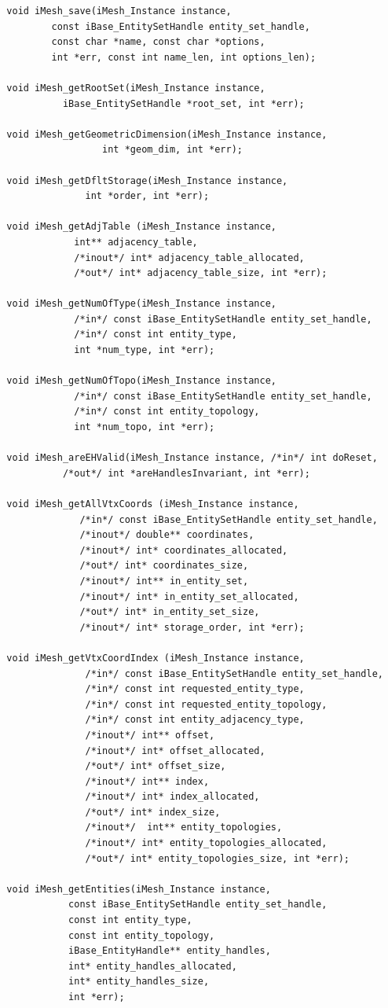 \documentclass{article}
\begin{document}
\begin{small}
\begin{verbatim}
  void iMesh_save(iMesh_Instance instance,
		  const iBase_EntitySetHandle entity_set_handle,
		  const char *name, const char *options,
		  int *err, const int name_len, int options_len);

  void iMesh_getRootSet(iMesh_Instance instance,
			iBase_EntitySetHandle *root_set, int *err);

  void iMesh_getGeometricDimension(iMesh_Instance instance,
				   int *geom_dim, int *err);

  void iMesh_getDfltStorage(iMesh_Instance instance,
			    int *order, int *err);

  void iMesh_getAdjTable (iMesh_Instance instance,
			  int** adjacency_table,
			  /*inout*/ int* adjacency_table_allocated,
			  /*out*/ int* adjacency_table_size, int *err);

  void iMesh_getNumOfType(iMesh_Instance instance,
			  /*in*/ const iBase_EntitySetHandle entity_set_handle,
			  /*in*/ const int entity_type,
			  int *num_type, int *err);

  void iMesh_getNumOfTopo(iMesh_Instance instance,
			  /*in*/ const iBase_EntitySetHandle entity_set_handle,
			  /*in*/ const int entity_topology,
			  int *num_topo, int *err);

  void iMesh_areEHValid(iMesh_Instance instance, /*in*/ int doReset,
			/*out*/ int *areHandlesInvariant, int *err);

  void iMesh_getAllVtxCoords (iMesh_Instance instance,
			   /*in*/ const iBase_EntitySetHandle entity_set_handle,
			   /*inout*/ double** coordinates,
			   /*inout*/ int* coordinates_allocated,
			   /*out*/ int* coordinates_size,
			   /*inout*/ int** in_entity_set,
			   /*inout*/ int* in_entity_set_allocated,
			   /*out*/ int* in_entity_set_size,
			   /*inout*/ int* storage_order, int *err);

  void iMesh_getVtxCoordIndex (iMesh_Instance instance,
			    /*in*/ const iBase_EntitySetHandle entity_set_handle,
			    /*in*/ const int requested_entity_type,
			    /*in*/ const int requested_entity_topology,
			    /*in*/ const int entity_adjacency_type,
			    /*inout*/ int** offset,
			    /*inout*/ int* offset_allocated,
			    /*out*/ int* offset_size,
			    /*inout*/ int** index,
			    /*inout*/ int* index_allocated,
			    /*out*/ int* index_size,
			    /*inout*/  int** entity_topologies,
			    /*inout*/ int* entity_topologies_allocated,
			    /*out*/ int* entity_topologies_size, int *err);

  void iMesh_getEntities(iMesh_Instance instance,
			 const iBase_EntitySetHandle entity_set_handle,
			 const int entity_type,
			 const int entity_topology,
			 iBase_EntityHandle** entity_handles,
			 int* entity_handles_allocated,
			 int* entity_handles_size,
			 int *err);


\end{verbatim}
\end{small}
\end{document}
